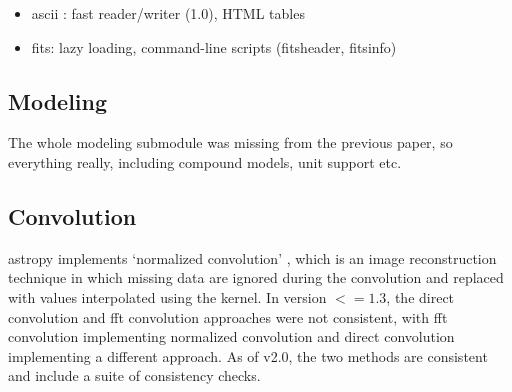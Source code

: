 \documentclass[modern]{aastex61}
\begin{document}
\begin{itemize}
\item ascii : fast reader/writer (1.0), HTML tables
\item fits: lazy loading, command-line scripts (fitsheader, fitsinfo)
\end{itemize}

\subsection{Modeling}
\label{sec:modeling}
The whole modeling submodule was missing from the previous paper, so everything really, including compound models, unit support etc.

\subsection{Convolution}

astropy implements `normalized convolution' \citep[e.g.,][]{Knutsson1993}, which is an image reconstruction technique in which missing data are ignored during the convolution and replaced with values interpolated using the kernel.   In version $<=1.3$, the direct convolution and fft convolution approaches were not consistent, with fft convolution implementing normalized convolution and direct convolution implementing a different approach.  As of v2.0, the two methods are consistent and include a suite of consistency checks.
\end{document}
